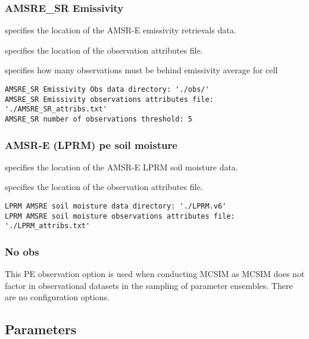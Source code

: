  
 \subsubsection{AMSRE\_SR Emissivity}
 \label{sssec:amsresremobs}
  specifies the location
 of the AMSR-E emissivity retrievals data.

  specifies the location
 of the observation attributes file.

  specifies how many observations
 must be behind emissivity average for cell
 

 \begin{Verbatim}[frame=single]
AMSRE_SR Emissivity Obs data directory: './obs/'
AMSRE_SR Emissivity observations attributes file: './AMSRE_SR_attribs.txt'
AMSRE_SR number of observations threshold: 5
 \end{Verbatim}

 
 \subsubsection{AMSR-E (LPRM) pe soil moisture}
 \label{sssec:amsrelprmsm}
  specifies the location
 of the AMSR-E LPRM soil moisture data.

  specifies the location
 of the observation attributes file.
 

 \begin{Verbatim}[frame=single]
LPRM AMSRE soil moisture data directory: './LPRM.v6'
LPRM AMSRE soil moisture observations attributes file: './LPRM_attribs.txt'
 \end{Verbatim}

 
 \subsubsection{No obs}
 \label{sssec:noobs}
 This PE observation option is used when conducting MCSIM as MCSIM
 does not factor in observational datasets
 in the sampling of parameter ensembles.  There are no configuration options.
 

 
 \subsection{Parameters} \label{ssec:parameters}
 

